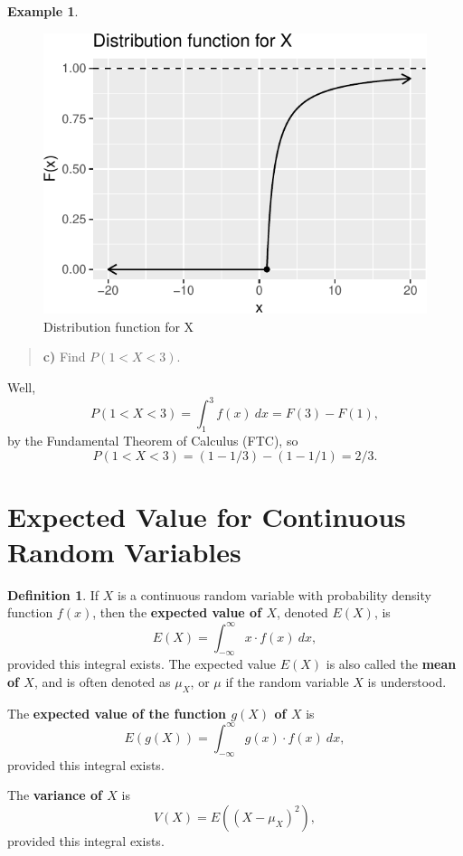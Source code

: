 \documentclass[
]{book}
\theoremstyle{definition}
\newtheorem{definition}{Definition}[chapter]
\theoremstyle{definition}
\newtheorem{example}{Example}[chapter]
\theoremstyle{definition}
\theoremstyle{definition}
\theoremstyle{remark}
\begin{document}
\begin{example}
\begin{figure}
\centering
\includegraphics{math340-notes_files/figure-latex/unnamed-chunk-15-1.pdf}
\caption{\label{fig:unnamed-chunk-15}Distribution function for X}
\end{figure}

\begin{quote}
\textbf{c)} Find \(P(1 < X < 3).\)
\end{quote}

Well, \[P(1 < X < 3) = \int_1^3 f(x)~dx = F(3)-F(1),\] by the Fundamental Theorem of Calculus (FTC), so \[P(1 < X < 3) = (1 - 1/3) - (1 - 1/1) = 2/3.\]
\end{example}

\section{Expected Value for Continuous Random Variables}\label{expected-value-for-continuous-random-variables}

\begin{definition}
\protect\hypertarget{def:expected-value-continuous}{}\label{def:expected-value-continuous}If \(X\) is a continuous random variable with probability density function \(f(x)\), then the \textbf{expected value of \(X\)}, denoted \(E(X)\), is \[E(X) = \int_{-\infty}^\infty x \cdot f(x)~dx,\] provided this integral exists. The expected value \(E(X)\) is also called the \textbf{mean of \(X\)}, and is often denoted as \(\mu_X\), or \(\mu\) if the random variable \(X\) is understood.

The \textbf{expected value of the function \(g(X)\) of \(X\)} is \[E(g(X)) = \int_{-\infty}^\infty g(x) \cdot f(x)~dx,\] provided this integral exists.

The \textbf{variance of \(X\)} is \[V(X) = E((X-\mu_X)^2),\] provided this integral exists.
\end{definition}
\end{document}
